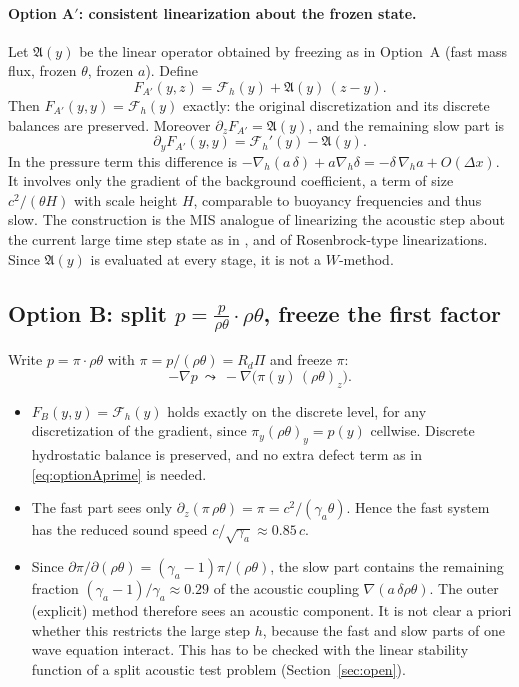 \documentclass[11pt,a4paper]{article}
\theoremstyle{definition}
\theoremstyle{remark}
\begin{document}
\paragraph{Option A$'$: consistent linearization about the frozen state.}
Let $\mathfrak A(y)$ be the linear operator obtained by freezing as in
Option~A (fast mass flux, frozen $\theta$, frozen $a$). Define
\begin{equation}\label{eq:optionAprime}
 F_{A'}(y,z)=\mathcal F_h(y)+\mathfrak A(y)\,(z-y).
\end{equation}
Then $F_{A'}(y,y)=\mathcal F_h(y)$ exactly: the original discretization
and its discrete balances are preserved. Moreover $\partial_zF_{A'}=\mathfrak A(y)$,
and the remaining slow part is
\begin{equation*}
 \partial_yF_{A'}(y,y)=\mathcal F_h'(y)-\mathfrak A(y).
\end{equation*}
In the pressure term this difference is
$-\nabla_h(a\,\delta)+a\nabla_h\delta=-\delta\,\nabla_ha+O(\Delta x)$.
It involves only the gradient of the background coefficient, a term of
size $c^2/(\theta H)$ with scale height $H$, comparable to buoyancy
frequencies and thus slow. The construction is the
MIS analogue of linearizing the acoustic step about the current large
time step state as in \cite{KlempSkamarockDudhia2007}, and of
Rosenbrock-type linearizations. Since $\mathfrak A(y)$ is evaluated at
every stage, it is not a $W$-method.

\subsection{Option B: split $p=\frac{p}{\rho\theta}\cdot\rho\theta$, freeze the first factor}

Write $p=\pi\cdot\rho\theta$ with $\pi=p/(\rho\theta)=R_d\Pi$ and freeze
$\pi$:
\begin{equation*}
 -\nabla p\ \leadsto\ -\nabla\big(\pi(y)\,(\rho\theta)_z\big).
\end{equation*}
\begin{itemize}
\item $F_B(y,y)=\mathcal F_h(y)$ holds exactly on the discrete level, for
  any discretization of the gradient, since $\pi_y(\rho\theta)_y=p(y)$
  cellwise. Discrete hydrostatic balance is preserved, and no extra
  defect term as in \eqref{eq:optionAprime} is needed.
\item The fast part sees only
  $\partial_z(\pi\,\rho\theta)=\pi=c^2/(\gamma_a\theta)$. Hence the fast
  system has the reduced sound speed $c/\sqrt{\gamma_a}\approx0.85\,c$.
\item Since $\partial\pi/\partial(\rho\theta)=(\gamma_a-1)\pi/(\rho\theta)$,
  the slow part contains the remaining fraction
  $(\gamma_a-1)/\gamma_a\approx0.29$ of the acoustic coupling
  $\nabla(a\,\delta\rho\theta)$. The outer (explicit) method therefore
  sees an acoustic component. It is not clear a priori whether this
  restricts the large step $h$, because the fast and slow
  parts of one wave equation interact. This has to be checked with the
  linear stability function of a split acoustic test problem
  (Section~\ref{sec:open}).
\end{itemize}
\end{document}
